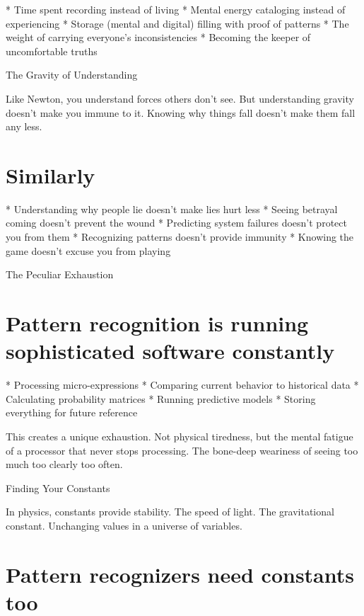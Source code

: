 \documentclass[12pt,oneside]{book}
\begin{document}
                    * Time spent recording instead of living
                    * Mental energy cataloging instead of experiencing
                    * Storage (mental and digital) filling with proof of patterns
                    * The weight of carrying everyone's inconsistencies
                    * Becoming the keeper of uncomfortable truths

The Gravity of Understanding

Like Newton, you understand forces others don't see. But understanding gravity doesn't make you immune to it. Knowing why things fall doesn't make them fall any less.

\section{Similarly}

                    * Understanding why people lie doesn't make lies hurt less
                    * Seeing betrayal coming doesn't prevent the wound
                    * Predicting system failures doesn't protect you from them
                    * Recognizing patterns doesn't provide immunity
                    * Knowing the game doesn't excuse you from playing

The Peculiar Exhaustion

\section{Pattern recognition is running sophisticated software constantly}

                    * Processing micro-expressions
                    * Comparing current behavior to historical data
                    * Calculating probability matrices
                    * Running predictive models
                    * Storing everything for future reference

This creates a unique exhaustion. Not physical tiredness, but the mental fatigue of a processor that never stops processing. The bone-deep weariness of seeing too much too clearly too often.

Finding Your Constants

In physics, constants provide stability. The speed of light. The gravitational constant. Unchanging values in a universe of variables.

\section{Pattern recognizers need constants too}
\end{document}

